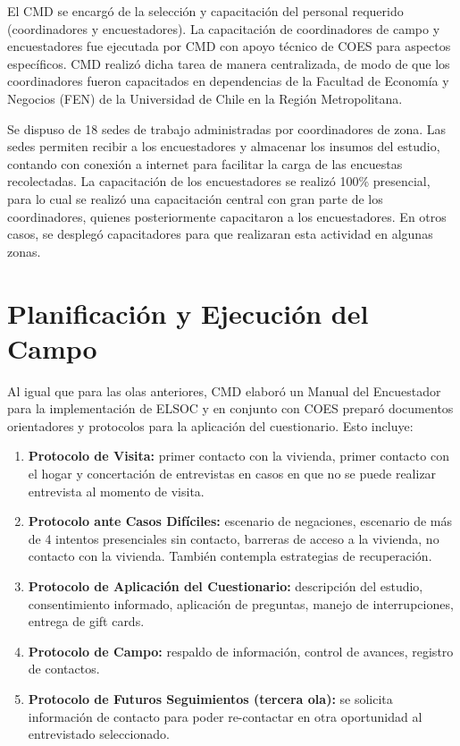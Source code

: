 \documentclass[
  openany]{book}
\providecommand{\tightlist}{%
  \setlength{\itemsep}{0pt}\setlength{\parskip}{0pt}}
\begin{document}
El CMD se encargó de la selección y capacitación del personal requerido (coordinadores y encuestadores). La capacitación de coordinadores de campo y encuestadores fue ejecutada por CMD con apoyo técnico de COES para aspectos específicos. CMD realizó dicha tarea de manera centralizada, de modo de que los coordinadores fueron capacitados en dependencias de la Facultad de Economía y Negocios (FEN) de la Universidad de Chile en la Región Metropolitana.

Se dispuso de 18 sedes de trabajo administradas por coordinadores de zona. Las sedes permiten recibir a los encuestadores y almacenar los insumos del estudio, contando con conexión a internet para facilitar la carga de las encuestas recolectadas. La capacitación de los encuestadores se realizó 100\% presencial, para lo cual se realizó una capacitación central con gran parte de los coordinadores, quienes posteriormente capacitaron a los encuestadores. En otros casos, se desplegó capacitadores para que realizaran esta actividad en algunas zonas.

\hypertarget{planificaciuxf3n-y-ejecuciuxf3n-del-campo}{%
\section{Planificación y Ejecución del Campo}\label{planificaciuxf3n-y-ejecuciuxf3n-del-campo}}

Al igual que para las olas anteriores, CMD elaboró un Manual del Encuestador para la implementación de ELSOC y en conjunto con COES preparó documentos orientadores y protocolos para la aplicación del cuestionario. Esto incluye:

\begin{enumerate}
\def\labelenumi{\arabic{enumi}.}
\tightlist
\item
  \textbf{Protocolo de Visita:} primer contacto con la vivienda, primer contacto con el hogar y concertación de entrevistas en casos en que no se puede realizar entrevista al momento de visita.
\item
  \textbf{Protocolo ante Casos Difíciles:} escenario de negaciones, escenario de más de 4 intentos presenciales sin contacto, barreras de acceso a la vivienda, no contacto con la vivienda. También contempla estrategias de recuperación.
\item
  \textbf{Protocolo de Aplicación del Cuestionario:} descripción del estudio, consentimiento informado, aplicación de preguntas, manejo de interrupciones, entrega de gift cards.
\item
  \textbf{Protocolo de Campo:} respaldo de información, control de avances, registro de contactos.
\item
  \textbf{Protocolo de Futuros Seguimientos (tercera ola):} se solicita información de contacto para poder re-contactar en otra oportunidad al entrevistado seleccionado.
\end{enumerate}
\end{document}
